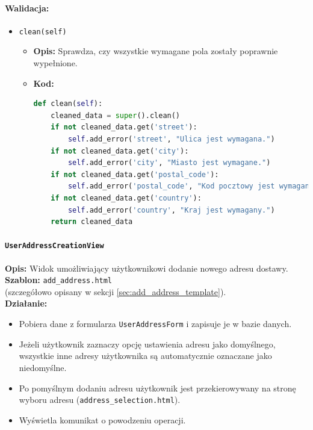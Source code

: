 \documentclass[12pt,a4paper,oneside]{article}
\theoremstyle{definition}
\numberwithin{equation}{section}
\begin{document}
\paragraph{Walidacja:}
\begin{itemize}
    \item \texttt{clean(self)}  
        \begin{itemize}
            \item \textbf{Opis:} Sprawdza, czy wszystkie wymagane pola zostały poprawnie wypełnione.
            \item \textbf{Kod:}
            \begin{lstlisting}[language=Python, caption=Walidacja formularza UserAddressForm]
def clean(self):
    cleaned_data = super().clean()
    if not cleaned_data.get('street'):
        self.add_error('street', "Ulica jest wymagana.")
    if not cleaned_data.get('city'):
        self.add_error('city', "Miasto jest wymagane.")
    if not cleaned_data.get('postal_code'):
        self.add_error('postal_code', "Kod pocztowy jest wymagany.")
    if not cleaned_data.get('country'):
        self.add_error('country', "Kraj jest wymagany.")
    return cleaned_data
            \end{lstlisting}
        \end{itemize}
\end{itemize}

\paragraph{\texttt{UserAddressCreationView}}
\vspace{0.5em}
\textbf{Opis:} Widok umożliwiający użytkownikowi dodanie nowego adresu dostawy. \\
\textbf{Szablon:} \texttt{add\_address.html} \\
(szczegółowo opisany w sekcji \ref{sec:add_address_template}). \\
\vspace{0.5em}
\textbf{Działanie:}
\begin{itemize}
    \item Pobiera dane z formularza \texttt{UserAddressForm} i zapisuje je w bazie danych.
    \item Jeżeli użytkownik zaznaczy opcję ustawienia adresu jako domyślnego, wszystkie inne adresy użytkownika są automatycznie oznaczane jako niedomyślne.
    \item Po pomyślnym dodaniu adresu użytkownik jest przekierowywany na stronę wyboru adresu (\texttt{address\_selection.html}).
    \item Wyświetla komunikat o powodzeniu operacji.
\end{itemize}
\end{document}
